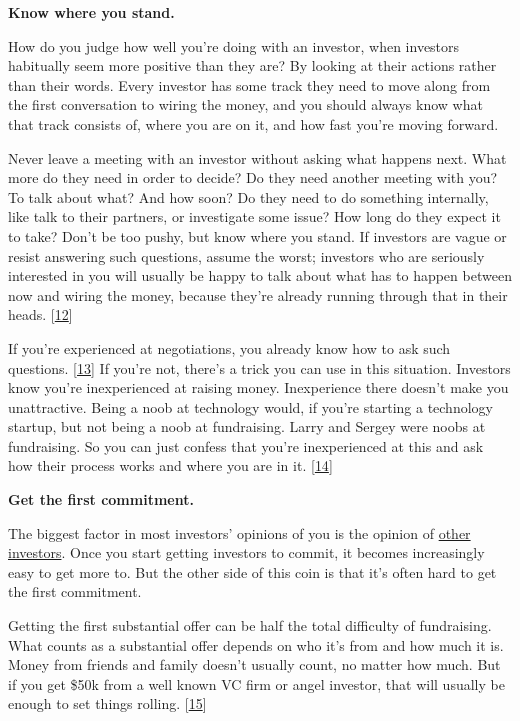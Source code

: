 \textbf{Know where you stand.}

How do you judge how well you're doing with an investor, when investors
habitually seem more positive than they are? By looking at their actions
rather than their words. Every investor has some track they need to move
along from the first conversation to wiring the money, and you should
always know what that track consists of, where you are on it, and how
fast you're moving forward.

Never leave a meeting with an investor without asking what happens next.
What more do they need in order to decide? Do they need another meeting
with you? To talk about what? And how soon? Do they need to do something
internally, like talk to their partners, or investigate some issue? How
long do they expect it to take? Don't be too pushy, but know where you
stand. If investors are vague or resist answering such questions, assume
the worst; investors who are seriously interested in you will usually be
happy to talk about what has to happen between now and wiring the money,
because they're already running through that in their heads.
{[}\hyperref[f12n]{12}{]}

If you're experienced at negotiations, you already know how to ask such
questions. {[}\hyperref[f13n]{13}{]} If you're not, there's a trick you
can use in this situation. Investors know you're inexperienced at
raising money. Inexperience there doesn't make you unattractive. Being a
noob at technology would, if you're starting a technology startup, but
not being a noob at fundraising. Larry and Sergey were noobs at
fundraising. So you can just confess that you're inexperienced at this
and ask how their process works and where you are in it.
{[}\hyperref[f14n]{14}{]}

\textbf{Get the first commitment.}

The biggest factor in most investors' opinions of you is the opinion of
\href{herd.html}{other investors}. Once you start getting investors to
commit, it becomes increasingly easy to get more to. But the other side
of this coin is that it's often hard to get the first commitment.

Getting the first substantial offer can be half the total difficulty of
fundraising. What counts as a substantial offer depends on who it's from
and how much it is. Money from friends and family doesn't usually count,
no matter how much. But if you get \$50k from a well known VC firm or
angel investor, that will usually be enough to set things rolling.
{[}\hyperref[f15n]{15}{]}

